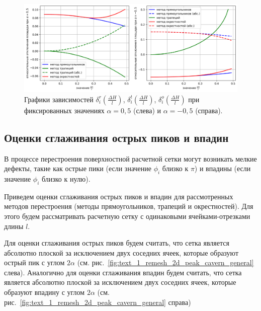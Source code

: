 \begin{figure}[ht]
\centering
\includegraphics[width=1.0\textwidth]{fig/2dr_remesh_fix_alfa_chart.png}
\singlespacing
{}\caption{Графики зависимостей $\delta_i^r(\frac{\Delta H}{l})$, $\delta_i^t(\frac{\Delta H}{l})$, $\delta_i^o(\frac{\Delta H}{l})$ при фиксированных значениях $\alpha = 0,5$ (слева) и $\alpha = -0,5$ (справа).}
\label{fig:text_1_remesh_fix_alfa_chart}
\end{figure}


\subsection{Оценки сглаживания острых пиков и впадин}

В процессе перестроения поверхностной расчетной сетки могут возникать мелкие дефекты, такие как острые пики (если значение $\phi_i$ близко к $\pi$) и впадины (если значение $\phi_i$ близко к нулю).

Приведем оценки сглаживания острых пиков и впадин для рассмотренных методов перестроения (методы прямоугольников, трапеций и окрестностей).
Для этого будем рассматривать расчетную сетку с одинаковыми ячейками-отрезками длины $l$.

Для оценки сглаживания острых пиков будем считать, что сетка является абсолютно плоской за исключением двух соседних ячеек, которые образуют острый пик с углом $2 \alpha$ (см. рис.~\ref{fig:text_1_remesh_2d_peak_cavern_general} слева).
Аналогично для оценки сглаживания впадин будем считать, что сетка является абсолютно плоской за исключением двух соседних ячеек, которые образуют впадину с углом $2 \alpha$ (см. рис.~\ref{fig:text_1_remesh_2d_peak_cavern_general} справа)

